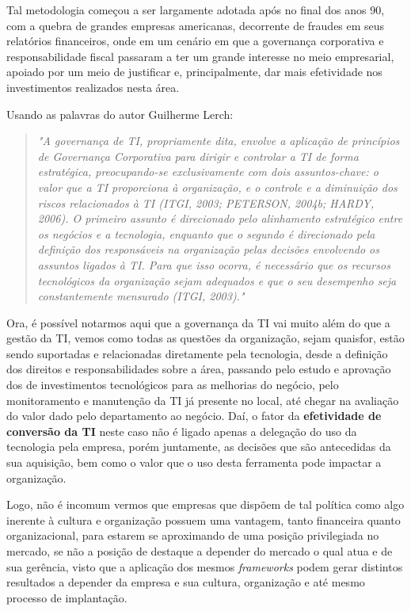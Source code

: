 Tal metodologia começou a ser largamente adotada após no final dos anos 90, com a quebra de grandes empresas americanas, decorrente de fraudes em seus relatórios financeiros, onde em um cenário em que a governança corporativa e responsabilidade fiscal passaram a ter um grande interesse no meio empresarial, apoiado por um meio de justificar e, principalmente, dar mais efetividade nos investimentos realizados nesta área.

Usando as palavras do autor Guilherme Lerch:
\begin{quotation}
\textit{"A governança de TI, propriamente dita, envolve a aplicação de princípios de
Governança Corporativa para dirigir e controlar a TI de forma estratégica, preocupando-se
exclusivamente com dois assuntos-chave: o valor que a TI proporciona à organização, e o
controle e a diminuição dos riscos relacionados à TI (ITGI, 2003\cite{ITGI}; PETERSON, 2004b\cite{PETERSON}; HARDY, 2006\cite{HARDY}). O primeiro assunto é direcionado pelo alinhamento estratégico entre os negócios e a tecnologia, enquanto que o segundo é direcionado pela definição dos responsáveis na organização pelas decisões envolvendo os assuntos ligados à TI. Para que isso ocorra, é necessário que os recursos tecnológicos da organização sejam adequados e que o seu desempenho seja constantemente mensurado (ITGI, 2003\cite{ITGI})."}
\end{quotation}

Ora, é possível notarmos aqui que a governança da TI vai muito além do que a gestão da TI, vemos como todas as questões da organização, sejam quaisfor, estão sendo suportadas e relacionadas diretamente pela tecnologia, desde a definição dos direitos e responsabilidades sobre a área, passando pelo estudo e aprovação dos de investimentos tecnológicos para as melhorias do negócio, pelo monitoramento e manutenção da TI já presente no local, até chegar na avaliação do valor dado pelo departamento ao negócio. Daí, o fator da \textbf{efetividade de conversão da TI} neste caso não é ligado apenas a delegação do uso da tecnologia pela empresa, porém juntamente, as decisões que são antecedidas da sua aquisição, bem como o valor que o uso desta ferramenta pode impactar a organização.

Logo, não é incomum vermos que empresas que dispõem de tal política como algo inerente à cultura e organização possuem uma vantagem, tanto financeira quanto organizacional, para estarem se aproximando de uma posição privilegiada no mercado, se não a posição de destaque a depender do mercado o qual atua e de sua gerência, visto que a aplicação dos mesmos {\it frameworks} podem gerar distintos resultados a depender da empresa e sua cultura, organização e até mesmo processo de implantação.

